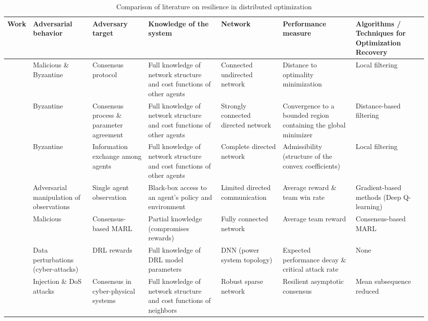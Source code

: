 \begin{table*}[htbp]
  \caption{Comparison of literature on resilience in distributed optimization}
  \centering
  \footnotesize %
  \begin{adjustbox}{width=\textwidth}
    \begin{tabular}{cp{1.5cm}p{1.5cm}p{3.5cm}p{2.5cm}p{2.5cm}p{3cm}}
      \toprule
      \textbf{Work} & \textbf{Adversarial behavior}  & \textbf{Adversary target} & \textbf{Knowledge of the system} & \textbf{Network} & \textbf{Performance measure} & \textbf{Algorithms / Techniques for Optimization Recovery} \\
      \midrule
      \cite{sundaram2018distributed} & Malicious \& Byzantine \footnotemark[2] & Consensus protocol & Full knowledge of network structure and cost functions of other agents & Connected undirected network & Distance to optimality minimization & Local filtering \\ 
      \midrule
      \cite{kuwaranancharoen2020byzantine} & Byzantine & Consensus process \& parameter agreement & Full knowledge of network structure and cost functions of other agents & Strongly connected directed network & Convergence to a bounded region containing the global minimizer & Distance-based filtering \\
      \midrule
      \cite{su2020byzantine} & Byzantine & Information exchange among agents & Full knowledge of network structure and cost functions of other agents & Complete directed network & Admissibility (structure of the convex coefficients) & Local filtering \\
      \midrule
      \cite{lin2020robustness} & Adversarial manipulation of observations & Single agent observation & Black-box access to an agent's policy and environment & Limited directed communication & Average reward \& team win rate & Gradient-based methods (Deep Q-learning) \\
      \midrule
      \cite{figura2021adversarial} & Malicious & Consensus-based MARL & Partial knowledge (compromises rewards) & Fully connected network & Average team reward & Consensus-based MARL \\
      \midrule
      \cite{zheng2021vulnerability} & Data perturbations (cyber-attacks) & DRL rewards & Full knowledge of DRL model parameters & DNN (power system topology) & Expected performance decay \& critical attack rate & None \\
      \midrule
      \cite{ishii2022overview} & Injection \& DoS attacks & Consensus in cyber-physical systems & Full knowledge of network structure and cost functions of neighbors & Robust sparse network & Resilient asymptotic consensus & Mean subsequence reduced \\

\end{tabular}
\end{adjustbox}
\end{table*}
